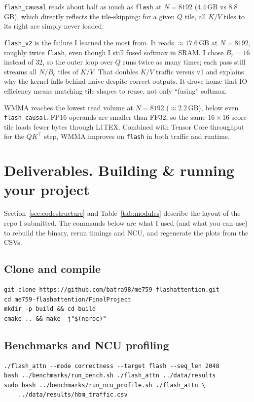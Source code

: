 \documentclass[12pt]{article}
\begin{document}
\texttt{flash\_causal} reads about half as much as \texttt{flash} at $N = 8192$ (4.4\,GB vs 8.8\,GB), which directly reflects the tile-skipping: for a given $Q$ tile, all $K/V$ tiles to its right are simply never loaded.

\texttt{flash\_v2} is the failure I learned the most from. It reads $\approx 17.6$\,GB at $N = 8192$, roughly twice \texttt{flash}, even though I still fused softmax in SRAM. I chose $B_r = 16$ instead of $32$, so the outer loop over $Q$ runs twice as many times; each pass still streams all $N / B_c$ tiles of $K/V$. That doubles $K/V$ traffic versus v1 and explains why the kernel falls behind naive despite correct outputs. It drove home that IO efficiency means matching tile shapes to reuse, not only ``fusing'' softmax.

WMMA reaches the lowest read volume at $N = 8192$ ($\approx 2.2$\,GB), below even \texttt{flash\_causal}. FP16 operands are smaller than FP32, so the same $16{\times}16$ score tile loads fewer bytes through L1TEX. Combined with Tensor Core throughput for the $QK^\top$ step, WMMA improves on \texttt{flash} in both traffic and runtime.

\section{Deliverables. Building \& running your project}
\label{sec:deliverables}

Section~\ref{sec:codestructure} and Table~\ref{tab:modules} describe the layout of the repo I submitted. The commands below are what I used (and what you can use) to rebuild the binary, rerun timings and NCU, and regenerate the plots from the CSVs.

\subsection{Clone and compile}
\begin{verbatim}
git clone https://github.com/batra98/me759-flashattention.git
cd me759-flashattention/FinalProject
mkdir -p build && cd build
cmake .. && make -j"$(nproc)"
\end{verbatim}

\subsection{Benchmarks and NCU profiling}
\begin{verbatim}
./flash_attn --mode correctness --target flash --seq_len 2048
bash ../benchmarks/run_bench.sh ./flash_attn ../data/results
sudo bash ../benchmarks/run_ncu_profile.sh ./flash_attn \
    ../data/results/hbm_traffic.csv
\end{verbatim}
\end{document}
